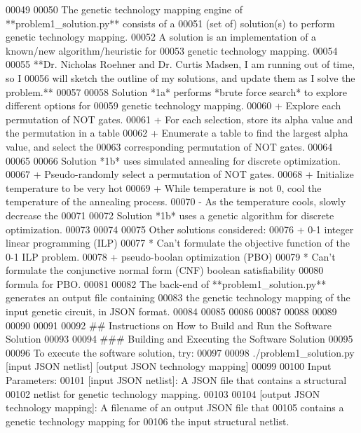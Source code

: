 \begin{DoxyCode}
00049 
00050 The genetic technology mapping engine of **problem1\_solution.py** consists of a
00051    (set of) solution(s) to perform genetic technology mapping.
00052    A solution is an implementation of a known/new algorithm/heuristic for
00053        genetic technology mapping.
00054 
00055 **Dr. Nicholas Roehner and Dr. Curtis Madsen, I am running out of time, so I
00056    will sketch the outline of my solutions, and update them as I solve the problem.**
00057 
00058 Solution *1a* performs *brute force search* to explore different options for
00059    genetic technology mapping.
00060 +  Explore each permutation of NOT gates.
00061 +  For each selection, store its alpha value and the permutation in a table
00062 + Enumerate a table to find the largest alpha value, and select the
00063        corresponding permutation of NOT gates.
00064 
00065 
00066 Solution *1b* uses simulated annealing for discrete optimization.
00067 + Pseudo-randomly select a permutation of NOT gates.
00068 + Initialize temperature to be very hot
00069 + While temperature is not 0, cool the temperature of the annealing process.
00070    - As the temperature cools, slowly decrease the
00071 
00072 Solution *1b* uses a genetic algorithm for discrete optimization.
00073 
00074 
00075 Other solutions considered:
00076 + 0-1 integer linear programming (ILP)
00077    * Can't formulate the objective function of the 0-1 ILP problem.
00078 + pseudo-boolan optimization (PBO)
00079    * Can't formulate the conjunctive normal form (CNF) boolean satisfiability
00080        formula for PBO.
00081 
00082 The back-end of **problem1\_solution.py** generates an output file containing
00083    the genetic technology mapping of the input genetic circuit, in JSON format.
00084 
00085 
00086 
00087 
00088 
00089 
00090 
00091 
00092 ##  Instructions on How to Build and Run the Software Solution
00093 
00094 ###    Building and Executing the Software Solution
00095 
00096 To execute the software solution, try:
00097 
00098    ./problem1\_solution.py [input JSON netlist] [output JSON technology mapping]
00099 
00100 Input Parameters:
00101 [input JSON netlist]:                          A JSON file that contains a structural
00102                                                                        netlist for genetic technology
       mapping.
00103 
00104 [output JSON technology mapping]:  A filename of an output JSON file that
00105                                                                        contains a genetic technology
       mapping for
00106                                                                        the input structural netlist.

\end{DoxyCode}
